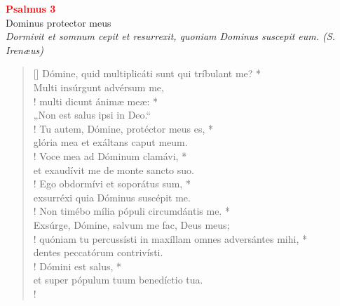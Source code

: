 


\def\greinitialformat#1{%
{\fontsize{39}{39}\selectfont #1}%
}




\vspace{0.3cm}
\begin{center}
 \textcolor{red}{\large \bf Psalmus 3}\\
Dominus protector meus\\
\textit{\small Dormivit et somnum cepit et resurrexit, quoniam Dominus suscepit eum. (S. Irenæus)}
\end{center}
\begin{verse}[\versewidth]
Dómine, quid multiplicáti sunt qui tríbulant me? *\\
Multi insúrgunt advérsum me,\\!
\vin multi dicunt ánimæ meæ: *\\
\vin „Non est salus ipsi in Deo.“\\!
Tu autem, Dómine, protéctor meus es, *\\
glória mea et exáltans caput meum.\\!
\vin Voce mea ad Dóminum clamávi, *\\
\vin et exaudívit me de monte sancto suo.\\!
Ego obdormívi et soporátus sum, *\\
exsurréxi quia Dóminus suscépit me.\\!
\vin Non timébo mília pópuli circumdántis me. *\\
\vin Exsúrge, Dómine, salvum me fac, Deus meus;\\!
quóniam tu percussísti \verselinebreak in maxíllam omnes adversántes mihi, *\\
dentes peccatórum contrivísti.\\!
\vin Dómini est salus, *\\
\vin et super pópulum tuum benedíctio tua.\\!
\end{verse}
\vspace{1cm}


